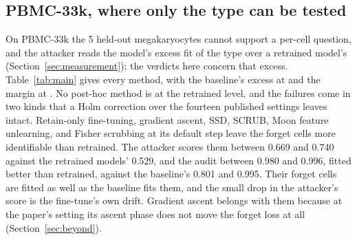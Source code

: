 \documentclass{article}
\begin{document}
\begin{table}[t]
\centering
\caption{PBMC-68k, the two forget sets, excerpted from the full tables of Appendix~\ref{app:tables}. The forget median is the per-cell negative ELBO's median over the forget cells, ranged over seeds. The per-cell column is the standardized refit against the within-type negatives, out of fold, with a nested interval over seeds and the shared cells, and the advantage is $2|\mathrm{AUC}-0.5|$ of it. The difference column compares each arm with the eight retrained models on those cells, read as Section~\ref{sec:measurement} describes at margins of \protect and \protect; no arm's interval is narrow enough for the verdict at the retrained level. The audit is the reference-free cross-type audit and the Type column its paired median gap. Generated from \texttt{percell\_paired\_\{mk,pdc\}.json} and \texttt{audit\_reference\_free.json}.}
\label{tab:pbmc68k_excerpt}
\small
\resizebox{\textwidth}{!}{}
\end{table}

\subsection{PBMC-33k, where only the type can be tested}

On PBMC-33k the 5 held-out megakaryocytes cannot support a per-cell question, and the attacker reads the model's excess fit of the type over a retrained model's (Section~\ref{sec:measurement}); the verdicts here concern that excess. Table~\ref{tab:main} gives every method, with the baseline's excess at  and the margin at . No post-hoc method is at the retrained level, and the failures come in two kinds that a Holm correction over the fourteen published settings leaves intact. Retain-only fine-tuning, gradient ascent, SSD, SCRUB, Moon feature unlearning, and Fisher scrubbing at its default step leave the forget cells more identifiable than retrained. The attacker scores them between 0.669 and 0.740 against the retrained models' 0.529, and the audit between 0.980 and 0.996, fitted better than retrained, against the baseline's 0.801 and 0.995. Their forget cells are fitted as well as the baseline fits them, and the small drop in the attacker's score is the fine-tune's own drift. Gradient ascent belongs with them because at the paper's setting its ascent phase does not move the forget loss at all (Section~\ref{sec:beyond}).
\end{document}
